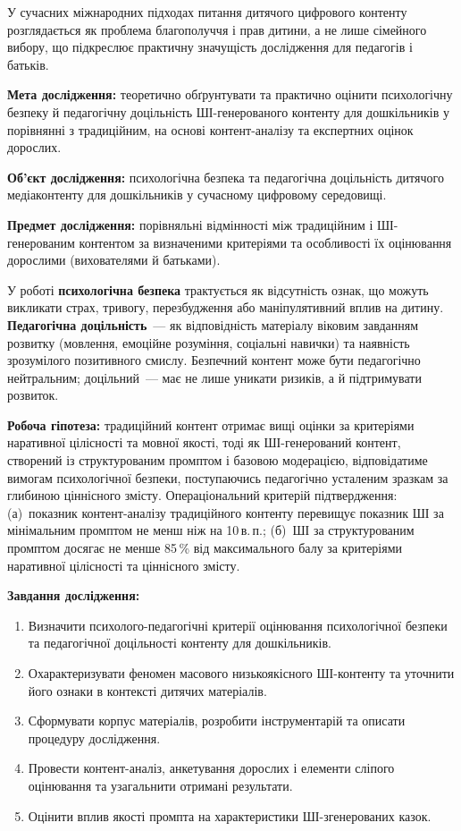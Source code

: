 \documentclass[14pt, a4paper]{extreport}
\begin{document}
У сучасних міжнародних підходах питання дитячого цифрового контенту розглядається як проблема благополуччя і прав дитини, а не лише сімейного вибору, що підкреслює практичну значущість дослідження для педагогів і батьків.

\textbf{Мета дослідження:} теоретично обґрунтувати та практично оцінити психологічну безпеку й педагогічну доцільність ШІ-генерованого контенту для дошкільників у порівнянні з традиційним, на основі контент-аналізу та експертних оцінок дорослих.

\textbf{Об'єкт дослідження:} психологічна безпека та педагогічна доцільність дитячого медіаконтенту для дошкільників у сучасному цифровому середовищі.

\textbf{Предмет дослідження:} порівняльні відмінності між традиційним і ШІ-генерованим контентом за визначеними критеріями та особливості їх оцінювання дорослими (вихователями й батьками).

У роботі \textbf{психологічна безпека} трактується як відсутність ознак, що можуть викликати страх, тривогу, перезбудження або маніпулятивний вплив на дитину. \textbf{Педагогічна доцільність}~--- як відповідність матеріалу віковим завданням розвитку (мовлення, емоційне розуміння, соціальні навички) та наявність зрозумілого позитивного смислу. Безпечний контент може бути педагогічно нейтральним; доцільний~--- має не лише уникати ризиків, а й підтримувати розвиток.

\textbf{Робоча гіпотеза:} традиційний контент отримає вищі оцінки за критеріями наративної цілісності та мовної якості, тоді як ШІ-генерований контент, створений із структурованим промптом і базовою модерацією, відповідатиме вимогам психологічної безпеки, поступаючись педагогічно усталеним зразкам за глибиною ціннісного змісту. Операціональний критерій підтвердження: (а)~показник контент-аналізу традиційного контенту перевищує показник ШІ за мінімальним промптом не менш ніж на 10\,в.\,п.; (б)~ШІ за структурованим промптом досягає не менше 85\,\% від максимального балу за критеріями наративної цілісності та ціннісного змісту.

\textbf{Завдання дослідження:}
\begin{enumerate}
  \item Визначити психолого-педагогічні критерії оцінювання психологічної безпеки та педагогічної доцільності контенту для дошкільників.
  \item Охарактеризувати феномен масового низькоякісного ШІ-контенту та уточнити його ознаки в контексті дитячих матеріалів.
  \item Сформувати корпус матеріалів, розробити інструментарій та описати процедуру дослідження.
  \item Провести контент-аналіз, анкетування дорослих і елементи сліпого оцінювання та узагальнити отримані результати.
  \item Оцінити вплив якості промпта на характеристики ШІ-згенерованих казок.
\end{enumerate}
\end{document}
